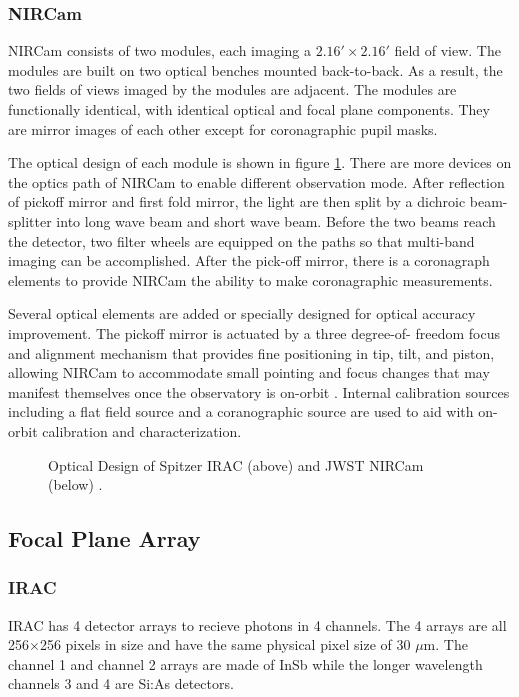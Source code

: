 \documentclass[preprint, 12pt]{aastex}
\begin{document}
\subsubsection{NIRCam}
NIRCam consists of two modules, each imaging a $2.16' \times 2.16'$
field of view.  The modules are built on two optical benches mounted
back-to-back. As a result, the two fields of views imaged by the
modules are adjacent.  The modules are functionally identical, with
identical optical and focal plane components. They are mirror images
of each other except for coronagraphic pupil masks.

The optical design of each module is shown in figure
\ref{fig:optics}. There are more devices on the optics path of NIRCam to enable
different observation mode. After reflection of pickoff mirror and
first fold mirror, the light are then split by a dichroic
beam-splitter into long wave beam and short wave beam. Before the two
beams reach the detector, two filter wheels are equipped on the paths
so that multi-band imaging can be accomplished. After the pick-off
mirror, there is a coronagraph elements to provide NIRCam the ability
to make coronagraphic measurements.

Several optical elements are added or specially designed for optical
accuracy improvement. The pickoff mirror is actuated by a three
degree-of- freedom focus and alignment mechanism that provides fine
positioning in tip, tilt, and piston, allowing NIRCam to accommodate
small pointing and focus changes that may manifest themselves once the
observatory is on-orbit \citep{2005SPIE.5904...30H}. Internal
calibration sources including a flat field source and a coranographic
source are used to aid with on-orbit calibration and characterization.


\begin{figure}
  \centering
  \caption{Optical Design of Spitzer IRAC (above)
    \citep{2004ApJS..154...10F} and JWST NIRCam (below) \citep{2005SPIE.5904...30H}.}
  \label{fig:optics}
\end{figure}

\subsection{Focal Plane Array}

\subsubsection{IRAC}
IRAC has 4 detector arrays to recieve photons in 4 channels. The 4
arrays are all 256$\times$256 pixels in size and have the same
physical pixel size of 30 $\mu$m. The channel 1 and channel 2 arrays
are made of InSb while the longer wavelength channels 3 and 4 are
Si:As detectors\citep{2004ApJS..154...10F}.
\end{document}
